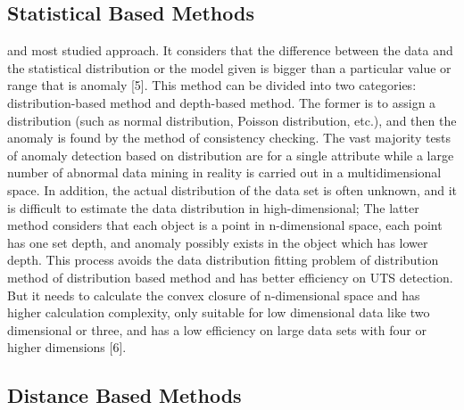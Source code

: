 \subsection{Statistical Based Methods}
and most studied approach.
It considers that the difference
between the data and the statistical distribution or the model
given is bigger than a particular value or range that is
anomaly [5].
This method can be divided into two
categories: distribution-based method and depth-based
method.
The former is to assign a distribution (such as
normal distribution,
Poisson distribution,
etc.),
and then the
anomaly is found by the method of consistency checking.
The vast majority tests of anomaly detection based on
distribution are for a single attribute while a large number
of abnormal data mining in reality is carried out in a
multidimensional space.
In addition,
the actual distribution
of the data set is often unknown,
and it is difficult to
estimate the data distribution in high-dimensional; The
latter method considers that each object is a point in
n-dimensional space,
each point has one set depth,
and anomaly possibly exists in the object which has lower depth.
This process avoids the data distribution fitting problem of
distribution method of distribution based method and has
better efficiency on UTS detection.
But it needs to calculate
the convex closure of n-dimensional space and has higher
calculation complexity,
only suitable for low dimensional
data like two dimensional or three,
and has a low efficiency
on large data sets with four or higher dimensions [6].

\subsection{Distance Based Methods}

